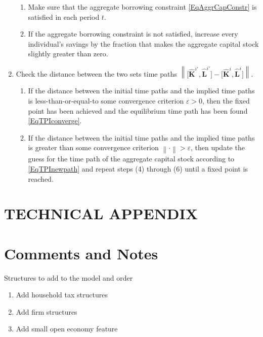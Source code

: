\documentclass[letterpaper,12pt]{article}
\theoremstyle{definition}
\newcommand\ve{\varepsilon}
\newcommand\norm[1]{\left\lVert#1\right\rVert}
\begin{document}
\begin{enumerate}
      \begin{enumerate}
        \item Make sure that the aggregate borrowing constraint \eqref{EqAggrCapConstr} is satisfied in each period $t$.
        \item If the aggregate borrowing constraint is not satisfied, increase every individual's savings by the fraction that makes the aggregate capital stock slightly greater than zero.
      \end{enumerate}
    \item Check the distance between the two sets time paths $\norm{\bigl[\bm{\hat{K}}^{i'}, \bm{\hat{L}}^{i'}\bigr] - \bigl[\bm{\hat{K}}^{i},\bm{\hat{L}}^{i}\bigr]}$.
      \begin{enumerate}
        \item If the distance between the initial time paths and the implied time paths is less-than-or-equal-to some convergence criterion $\ve>0$, then the fixed point has been achieved and the equilibrium time path has been found \eqref{EqTPIconverge}.
        \item If the distance between the initial time paths and the implied time paths is greater than some convergence criterion $\norm{\cdot}>\ve$, then update the guess for the time path of the aggregate capital stock according to \eqref{EqTPInewpath} and repeat steps (4) through (6) until a fixed point is reached.
      \end{enumerate}
  \end{enumerate}

  \clearpage


\newpage




\newpage
\renewcommand{\theequation}{T.\arabic{section}.\arabic{equation}}
\renewcommand{\thesection}{T-\arabic{section}}   %
\setcounter{equation}{0}                         %
\setcounter{section}{0}                          %
\section*{TECHNICAL APPENDIX}


\section{Comments and Notes}\label{TAppComments}

  \noindent Structures to add to the model and order
  \begin{enumerate}
    \item Add household tax structures
    \item Add firm structures
    \item Add small open economy feature
  \end{enumerate}
\end{document}
